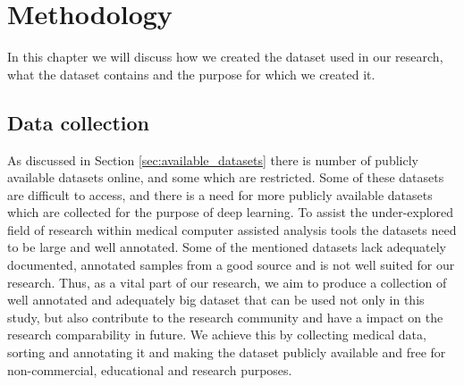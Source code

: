 \documentclass[thesis.tex]{subfiles}
\begin{document}
\chapter{Methodology} \label{chap:methodology}
In this chapter we will discuss how we created the dataset used in our research, what the dataset contains and the purpose for which we created it. 




\section{Data collection} \label{sec:data_collection}
As discussed in Section \ref{sec:available_datasets} there is number of publicly available datasets online, and some which are restricted. Some of these datasets are difficult to access, and there is a need for more publicly available datasets which are collected for the purpose of deep learning. To assist the under-explored field of research within medical computer assisted analysis tools the datasets need to be large and well annotated. Some of the mentioned datasets lack adequately documented, annotated samples from a good source and is not well suited for our research. Thus, as a vital part of our research, we aim to produce a collection of well annotated and adequately big dataset that can be used not only in this study, but also contribute to the research community and have a impact on the research comparability in future. We achieve this by collecting medical data, sorting and annotating it and making the dataset publicly available and free for non-commercial, educational and research purposes.
\end{document}
